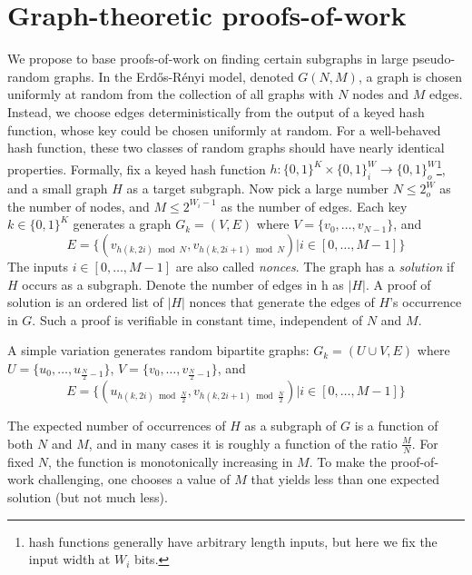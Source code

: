 \documentclass[11pt, oneside]{article}
\begin{document}
\section{Graph-theoretic proofs-of-work}
We propose to base proofs-of-work on finding certain subgraphs in large pseudo-random graphs.
In the Erd\H{o}s-R\'{e}nyi model, denoted $G(N,M)$, a graph is chosen uniformly at random
from the collection of all graphs with $N$ nodes and $M$ edges. Instead, we choose edges
deterministically from the output of a keyed hash function, whose key could be chosen
uniformly at random. For a well-behaved hash function, these two classes of random graphs
should have nearly identical  properties.
Formally, fix a keyed hash function
$h: \{0,1\}^K \times \{0,1\}^W_i \rightarrow \{0,1\}^W_o$\footnote{hash functions generally
have arbitrary length inputs, but here we fix the input width at $W_i$ bits.},
and a small graph $H$ as a target subgraph.
Now pick a large number $N \leq 2^W_o$ as the number of nodes,
and $M \leq 2^{W_i-1}$ as the number of edges.
Each key $k \in \{0,1\}^K$ generates a graph $G_k = (V,E)$ where $V=\{v_0,\ldots,v_{N-1}\}$, and
\begin{equation}
E=\{(v_{h(k,2i) \bmod N},v_{h(k,2i+1) \bmod N}) | i \in [0,\ldots,M-1]\}
\end{equation}
The inputs $i \in [0,\ldots,M-1]$ are also called {\em nonces}.
The graph has a {\em solution} if $H$ occurs as a subgraph.
Denote the number of edges in h as $|H|$.
A proof of solution is an ordered list of $|H|$ nonces that generate the edges
of $H$'s occurrence in $G$.
Such a proof is verifiable in constant time, independent of $N$ and $M$.

A simple variation generates random bipartite graphs:
$G_k = (U \cup V,E)$ where $U=\{u_0,\ldots,u_{\frac{N}{2}-1}\}$, $V=\{v_0,\ldots,v_{\frac{N}{2}-1}\}$,
and
\begin{equation}
E=\{(u_{h(k,2i) \bmod \frac{N}{2}}, v_{h(k,2i+1) \bmod \frac{N}{2}}) | i \in [0,\ldots,M-1]\}
\end{equation}


The expected number of occurrences of $H$ as a subgraph of $G$ is a function of both $N$ and $M$,
and in many cases it is roughly a function of the ratio $\frac{M}{N}$.
For fixed $N$, the function is monotonically increasing in $M$.
To make the proof-of-work challenging, one chooses a value of $M$ that yields less than one
expected solution (but not much less).
\end{document}
